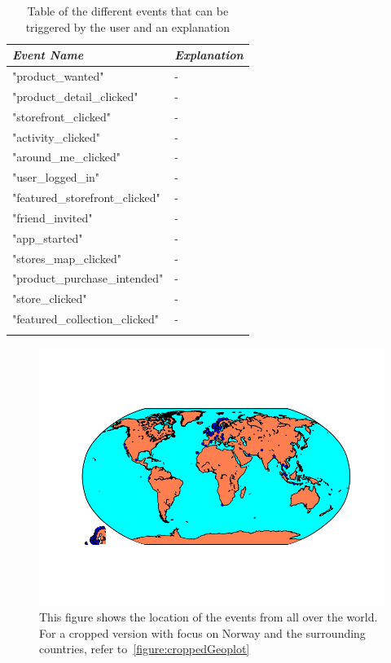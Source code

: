     \begin{table}[H]
        \centering
        \begin{tabular}{l|l}
            \toprule
            \emph{Event Name}     & \emph{Explanation}   \\ \hline
            "product\_wanted"            & - \\ \hline
            "product\_detail\_clicked"    & - \\ \hline
            "storefront\_clicked"        & - \\ \hline
            "activity\_clicked"          & - \\ \hline
            "around\_me\_clicked"         & - \\ \hline
            "user\_logged\_in"            & - \\ \hline
            "featured\_storefront\_clicked"   & - \\ \hline
            "friend\_invited"    & - \\ \hline
            "app\_started"   & - \\ \hline
            "stores\_map\_clicked"    & - \\ \hline
            "product\_purchase\_intended" & - \\ \hline
            "store\_clicked" & - \\ \hline
            "featured\_collection\_clicked" & - \\
            \bottomrule
        \caption[List of Different Events]{Table of the different events that can be triggered by the user and an explanation}
        \label{table:events}
        \end{tabular}
    \end{table}


    \begin{figure}[H]
        \includegraphics[width=5in]{image/simpleGeoPlotworld.png}
        \centering
        \caption[Event location mapped on the world]{This figure shows the location of the events from all over the world.
        For a cropped version with focus on Norway and the surrounding countries, refer to~\ref{figure:croppedGeoplot}}
    \end{figure}

